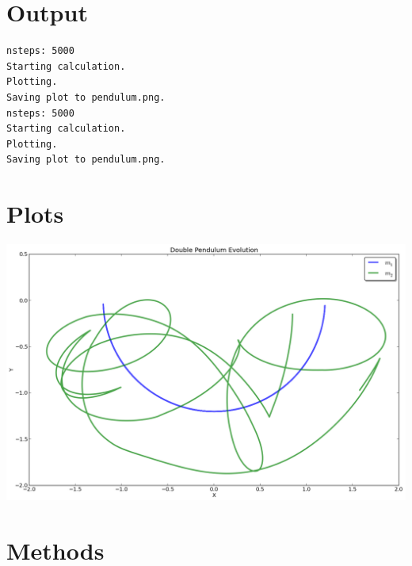 \documentclass[letterpaper,10pt,english]{sphinxmanual}
\begin{document}
\section{Output}
\label{index:id3}
\begin{Verbatim}[commandchars=\\\{\}]
nsteps: 5000
Starting calculation.
Plotting.
Saving plot to pendulum.png.
nsteps: 5000
Starting calculation.
Plotting.
Saving plot to pendulum.png.
\end{Verbatim}


\section{Plots}
\label{index:id4}
\includegraphics{pendulum.png}


\section{Methods}
\label{index:id5}\label{index:module-doublePendulum}
\end{document}
